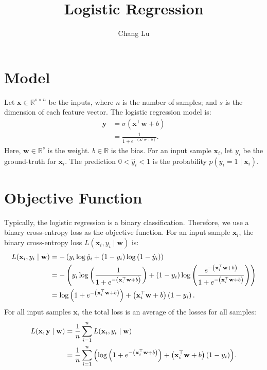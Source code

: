 \documentclass{article}
\title{Logistic Regression}
\author{Chang Lu}
\begin{document}
\maketitle

\section{Model}
Let $\mathbf{x} \in \mathbb{R}^{s \times n}$ be the inputs, where $n$ is the number of samples; and $s$ is the dimension of each feature vector. The logistic regression model is:
\begin{align}
    \hat{\mathbf{y}} &= \sigma\left(\mathbf{x}^\top\mathbf{w} + b\right) \\
    & = \frac{1}{1 + e^{-\left(\mathbf{x^\top w} + b\right)}}.
\end{align}
Here, $\mathbf{w} \in \mathbb{R}^s$ is the weight. $b \in \mathbb{R}$ is the bias. For an input sample $\mathbf{x}_i$, let $y_i$ be the ground-truth for $\mathbf{x}_i$. The prediction $0 < \hat{{y}}_i < 1$ is the probability $p\left(y_i = 1 \mid \mathbf{x}_i\right)$.

\section{Objective Function}
Typically, the logistic regression is a binary classification. Therefore, we use a binary cross-entropy loss as the objective function. For an input sample $\mathbf{x}_i$, the binary cross-entropy loss $L(\mathbf{x}_i, y_i \mid \mathbf{w})$ is:
\begin{align}
    L(\mathbf{x}_i, y_i \mid \mathbf{w}) &= -\left(y_i \log\hat{y}_i + \left(1 - y_i\right)\log\left(1 - \hat{y}_i\right)\right) \\
    &= -\left(y_i \log\left(\frac{1}{1 + e^{-\left(\mathbf{x}^\top_i\mathbf{w} + b\right)}}\right) + \left(1 - y_i\right)\log\left(\frac{e^{-\left(\mathbf{x}^\top_i\mathbf{w} + b\right)}}{1 + e^{-\left(\mathbf{x}^\top_i\mathbf{w} + b\right)}}\right)\right) \notag \\
    &= \log\left(1 + e^{-\left(\mathbf{x}^\top_i\mathbf{w} + b\right)}\right) + \left(\mathbf{x}^\top_i\mathbf{w} + b\right)\left(1 - y_i\right).
\end{align}
For all input samples $\mathbf{x}$, the total loss is an average of the losses for all samples:
\begin{align}
    L(\mathbf{x}, \mathbf{y} \mid \mathbf{w}) &= \frac{1}{n}\sum_{i = 1}^{n}{L(\mathbf{x}_i, y_i \mid \mathbf{w})} \notag \\
    &= \frac{1}{n}\sum_{i = 1}^{n}{\left(\log\left(1 + e^{-\left(\mathbf{x}^\top_i\mathbf{w} + b\right)}\right) + \left(\mathbf{x}^\top_i\mathbf{w} + b\right)\left(1 - y_i\right)\right)}.
\end{align}
\end{document}
